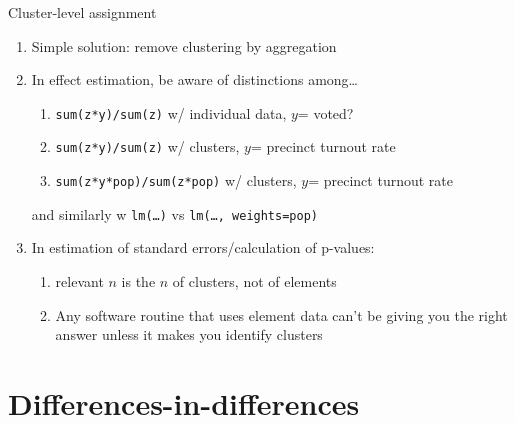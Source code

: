 \begin{frame}{Cluster-level assignment}

  \begin{enumerate}
  \item Simple solution: remove clustering by aggregation
\item In effect estimation, be aware of distinctions among\ldots
  \begin{enumerate}
    \item \texttt{sum(z*y)/sum(z)} w/ individual data, $y$= voted?
  \item \texttt{sum(z*y)/sum(z)} w/ clusters,  $y$= precinct turnout rate
  \item \texttt{sum(z*y*pop)/sum(z*pop)} w/ clusters, $y$= precinct turnout rate
  \end{enumerate}
and similarly w \texttt{lm(\ldots)} vs \texttt{lm(\ldots,
  weights=pop)}
\item In estimation of standard errors/calculation of p-values:
  \begin{enumerate}
  \item relevant $n$ is the $n$ of clusters, not of elements
  \item Any software routine that uses element data can't be giving
    you the right answer unless it makes you identify clusters
  \end{enumerate}

  \end{enumerate}

\end{frame}





\section{Differences-in-differences}



